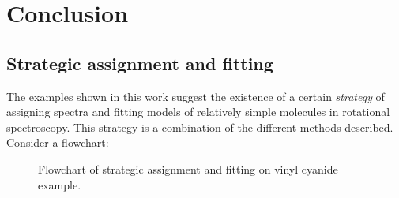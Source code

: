 \documentclass[11pt]{article}
\begin{document}



\FloatBarrier
\section{Conclusion}

\subsection{Strategic assignment and fitting}

The examples shown in this work suggest the existence of a certain \emph{strategy} of assigning spectra and fitting models of relatively simple molecules in rotational spectroscopy. This strategy is a combination of the different methods described. Consider a flowchart:

\begin{figure}[h]
\caption{\small Flowchart of strategic assignment and fitting on vinyl cyanide example. 
}
\label{fig:strategy_1}
\end{figure}
\end{document}
